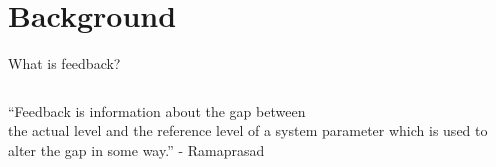 \documentclass[10pt]{beamer}
\begin{document}
\section{Background}


\begin{frame}[fragile]{What is feedback?}
  \begin{columns}[T]
    \begin{column}{.8\textwidth}
      \begin{block}{}
        ``Feedback is information about the gap between\\ the actual level and the reference level of a system parameter which is used to alter the gap in some way.'' - Ramaprasad~\cite{Ramaprasad1983}
      \end{block}
    \end{column}
  \end{columns}
\end{frame}

\end{document}
